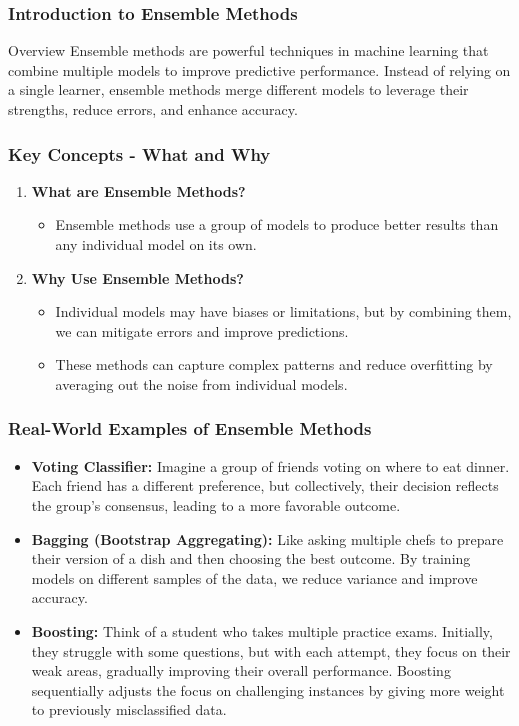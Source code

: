 \documentclass[aspectratio=169]{beamer}
\begin{document}
\frame{\titlepage}

\begin{frame}[fragile]
    \frametitle{Introduction to Ensemble Methods}
    \begin{block}{Overview}
        Ensemble methods are powerful techniques in machine learning that combine multiple models to improve predictive performance. Instead of relying on a single learner, ensemble methods merge different models to leverage their strengths, reduce errors, and enhance accuracy.
    \end{block}
\end{frame}

\begin{frame}[fragile]
    \frametitle{Key Concepts - What and Why}
    \begin{enumerate}
        \item \textbf{What are Ensemble Methods?}
        \begin{itemize}
            \item Ensemble methods use a group of models to produce better results than any individual model on its own.
        \end{itemize}
        
        \item \textbf{Why Use Ensemble Methods?}
        \begin{itemize}
            \item Individual models may have biases or limitations, but by combining them, we can mitigate errors and improve predictions.
            \item These methods can capture complex patterns and reduce overfitting by averaging out the noise from individual models.
        \end{itemize}
    \end{enumerate}
\end{frame}

\begin{frame}[fragile]
    \frametitle{Real-World Examples of Ensemble Methods}
    \begin{itemize}
        \item \textbf{Voting Classifier:} Imagine a group of friends voting on where to eat dinner. Each friend has a different preference, but collectively, their decision reflects the group’s consensus, leading to a more favorable outcome.
        
        \item \textbf{Bagging (Bootstrap Aggregating):} Like asking multiple chefs to prepare their version of a dish and then choosing the best outcome. By training models on different samples of the data, we reduce variance and improve accuracy.
        
        \item \textbf{Boosting:} Think of a student who takes multiple practice exams. Initially, they struggle with some questions, but with each attempt, they focus on their weak areas, gradually improving their overall performance. Boosting sequentially adjusts the focus on challenging instances by giving more weight to previously misclassified data.
    \end{itemize}
\end{frame}
\end{document}
